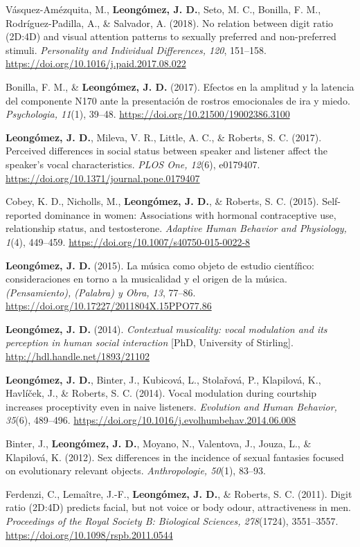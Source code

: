 \documentclass[11pt,a4paper,]{awesome-cv}
\begin{document}
Vásquez-Amézquita, M., \textbf{Leongómez, J. D.}, Seto, M. C., Bonilla,
F. M., Rodríguez-Padilla, A., \& Salvador, A. (2018). No relation
between digit ratio (2D:4D) and visual attention patterns to sexually
preferred and non-preferred stimuli. \emph{Personality and Individual
Differences, 120}, 151--158.
\url{https://doi.org/10.1016/j.paid.2017.08.022}

Bonilla, F. M., \& \textbf{Leongómez, J. D.} (2017). Efectos en la
amplitud y la latencia del componente N170 ante la presentación de
rostros emocionales de ira y miedo. \emph{Psychologia, 11}(1), 39--48.
\url{https://doi.org/10.21500/19002386.3100}

\textbf{Leongómez, J. D.}, Mileva, V. R., Little, A. C., \& Roberts, S.
C. (2017). Perceived differences in social status between speaker and
listener affect the speaker's vocal characteristics. \emph{PLOS One,
12}(6), e0179407. \url{https://doi.org/10.1371/journal.pone.0179407}

Cobey, K. D., Nicholls, M., \textbf{Leongómez, J. D.}, \& Roberts, S. C.
(2015). Self-reported dominance in women: Associations with hormonal
contraceptive use, relationship status, and testosterone. \emph{Adaptive
Human Behavior and Physiology, 1}(4), 449--459.
\url{https://doi.org/10.1007/s40750-015-0022-8}

\textbf{Leongómez, J. D.} (2015). La música como objeto de estudio
científico: consideraciones en torno a la musicalidad y el origen de la
música. \emph{(Pensamiento), (Palabra) y Obra, 13}, 77--86.
\url{https://doi.org/10.17227/2011804X.15PPO77.86}

\textbf{Leongómez, J. D.} (2014). \emph{Contextual musicality: vocal
modulation and its perception in human social interaction} {[}PhD,
University of Stirling{]}. \url{http://hdl.handle.net/1893/21102}

\textbf{Leongómez, J. D.}, Binter, J., Kubicová, L., Stolařová, P.,
Klapilová, K., Havlíček, J., \& Roberts, S. C. (2014). Vocal modulation
during courtship increases proceptivity even in naive listeners.
\emph{Evolution and Human Behavior, 35}(6), 489--496.
\url{https://doi.org/10.1016/j.evolhumbehav.2014.06.008}

Binter, J., \textbf{Leongómez, J. D.}, Moyano, N., Valentova, J., Jouza,
L., \& Klapilová, K. (2012). Sex differences in the incidence of sexual
fantasies focused on evolutionary relevant objects. \emph{Anthropologie,
50}(1), 83--93.

Ferdenzi, C., Lemaître, J.-F., \textbf{Leongómez, J. D.}, \& Roberts, S.
C. (2011). Digit ratio (2D:4D) predicts facial, but not voice or body
odour, attractiveness in men. \emph{Proceedings of the Royal Society B:
Biological Sciences, 278}(1724), 3551--3557.
\url{https://doi.org/10.1098/rspb.2011.0544}
\end{document}
